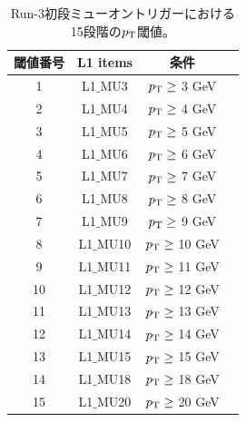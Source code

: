 \begin{table}[]
    \caption{Run-3初段ミューオントリガーにおける15段階の$p_{\rm{T}}$閾値\cite{article:shiomi-mron}。}
    \label{pt_number}
    \centering
    \begin{tabular}{|c|c|c|c|}
        \hline
        閾値番号 & L1 items & 条件\\
        \hline
        1 & L1$\_$MU3 & $p_{\rm{T}} \geq$ 3 GeV \\
        \hline
        2 & L1$\_$MU4 & $p_{\rm{T}} \geq$ 4 GeV \\
        \hline
        3 & L1$\_$MU5 & $p_{\rm{T}} \geq$ 5 GeV \\
        \hline
        4 & L1$\_$MU6 & $p_{\rm{T}} \geq$ 6 GeV \\
        \hline
        5 & L1$\_$MU7 & $p_{\rm{T}} \geq$ 7 GeV \\
        \hline
        6 & L1$\_$MU8 & $p_{\rm{T}} \geq$ 8 GeV \\
        \hline
        7 & L1$\_$MU9 & $p_{\rm{T}} \geq$ 9 GeV \\
        \hline
        8 & L1$\_$MU10 & $p_{\rm{T}} \geq$ 10 GeV \\
        \hline
        9 & L1$\_$MU11 & $p_{\rm{T}} \geq$ 11 GeV \\
        \hline
        10 & L1$\_$MU12 & $p_{\rm{T}} \geq$ 12 GeV \\
        \hline
        11 & L1$\_$MU13 & $p_{\rm{T}} \geq$ 13 GeV \\
        \hline
        12 & L1$\_$MU14 & $p_{\rm{T}} \geq$ 14 GeV \\
        \hline
        13 & L1$\_$MU15 & $p_{\rm{T}} \geq$ 15 GeV \\
        \hline
        14 & L1$\_$MU18 & $p_{\rm{T}} \geq$ 18 GeV \\
        \hline
        15 & L1$\_$MU20 & $p_{\rm{T}} \geq$ 20 GeV \\
        \hline
    \end{tabular}
\end{table}

